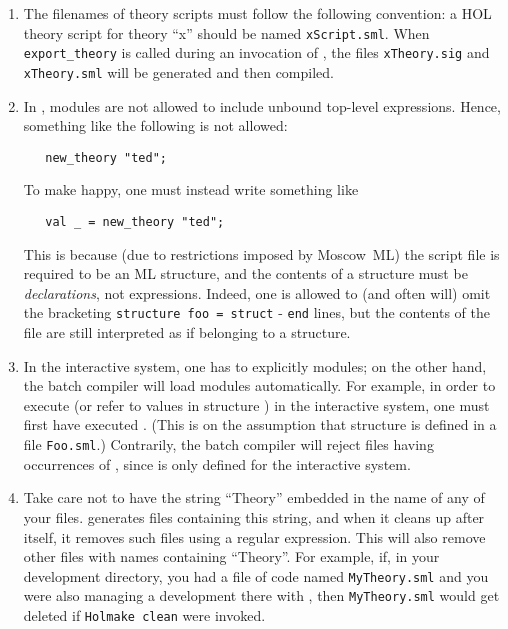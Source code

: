 \begin{enumerate}
\item The filenames of theory scripts must follow the following
  convention: a HOL theory script for theory ``x'' should be named
  \texttt{xScript.sml}.  When \verb+export_theory+ is called during an
  invocation of \holmake, the files \texttt{xTheory.sig} and
  \texttt{xTheory.sml} will be generated and then compiled.

\item In \ML{}, modules are not allowed to include unbound top-level expressions.
  Hence, something like the following is not allowed:
\begin{verbatim}
   new_theory "ted";
\end{verbatim}
To make \ML{} happy, one must instead write something like
\begin{verbatim}
   val _ = new_theory "ted";
\end{verbatim}
\noindent
This is because (due to restrictions imposed by Moscow~ML) the script file is required to be an ML structure, and the contents of a structure must be \emph{declarations}, not expressions.
Indeed, one is allowed to (and often will) omit the bracketing \texttt{structure~foo~=~struct} - \texttt{end} lines, but the contents of the file are still interpreted as if belonging to a structure.

\item In the interactive system, one has to explicitly  modules; on the other hand, the batch compiler will load modules automatically.
For example, in order to execute  (or refer to values in structure ) in the interactive system, one must first have executed .
(This is on the assumption that structure  is defined in a file \texttt{Foo.sml}.)
Contrarily, the batch compiler will reject files having occurrences of , since  is only defined for the interactive system.

\item Take care not to have the string ``Theory'' embedded in the name of any of your files.
\HOL{} generates files containing this string, and when it cleans up after itself, it removes such files using a regular expression.
This will also remove other files with names containing ``Theory''.
For example, if, in your development directory, you had a file of \ML{} code named \texttt{MyTheory.sml} and you were also managing a \HOL{} development there with \holmake, then \texttt{MyTheory.sml} would get deleted if \texttt{Holmake~clean} were invoked.

\end{enumerate}

